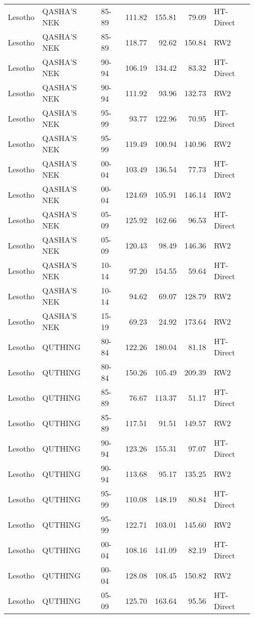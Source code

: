 \begin{longtable}{lllrrrl}
  Lesotho & QASHA'S NEK & 85-89 & 111.82 & 155.81 & 79.09 & HT-Direct \\ 
  Lesotho & QASHA'S NEK & 85-89 & 118.77 & 92.62 & 150.84 & RW2 \\ 
  Lesotho & QASHA'S NEK & 90-94 & 106.19 & 134.42 & 83.32 & HT-Direct \\ 
  Lesotho & QASHA'S NEK & 90-94 & 111.92 & 93.96 & 132.73 & RW2 \\ 
  Lesotho & QASHA'S NEK & 95-99 & 93.77 & 122.96 & 70.95 & HT-Direct \\ 
  Lesotho & QASHA'S NEK & 95-99 & 119.49 & 100.94 & 140.96 & RW2 \\ 
  Lesotho & QASHA'S NEK & 00-04 & 103.49 & 136.54 & 77.73 & HT-Direct \\ 
  Lesotho & QASHA'S NEK & 00-04 & 124.69 & 105.91 & 146.14 & RW2 \\ 
  Lesotho & QASHA'S NEK & 05-09 & 125.92 & 162.66 & 96.53 & HT-Direct \\ 
  Lesotho & QASHA'S NEK & 05-09 & 120.43 & 98.49 & 146.36 & RW2 \\ 
  Lesotho & QASHA'S NEK & 10-14 & 97.20 & 154.55 & 59.64 & HT-Direct \\ 
  Lesotho & QASHA'S NEK & 10-14 & 94.62 & 69.07 & 128.79 & RW2 \\ 
  Lesotho & QASHA'S NEK & 15-19 & 69.23 & 24.92 & 173.64 & RW2 \\ 
  Lesotho & QUTHING & 80-84 & 122.26 & 180.04 & 81.18 & HT-Direct \\ 
  Lesotho & QUTHING & 80-84 & 150.26 & 105.49 & 209.39 & RW2 \\ 
  Lesotho & QUTHING & 85-89 & 76.67 & 113.37 & 51.17 & HT-Direct \\ 
  Lesotho & QUTHING & 85-89 & 117.51 & 91.51 & 149.57 & RW2 \\ 
  Lesotho & QUTHING & 90-94 & 123.26 & 155.31 & 97.07 & HT-Direct \\ 
  Lesotho & QUTHING & 90-94 & 113.68 & 95.17 & 135.25 & RW2 \\ 
  Lesotho & QUTHING & 95-99 & 110.08 & 148.19 & 80.84 & HT-Direct \\ 
  Lesotho & QUTHING & 95-99 & 122.71 & 103.01 & 145.60 & RW2 \\ 
  Lesotho & QUTHING & 00-04 & 108.16 & 141.09 & 82.19 & HT-Direct \\ 
  Lesotho & QUTHING & 00-04 & 128.08 & 108.45 & 150.82 & RW2 \\ 
  Lesotho & QUTHING & 05-09 & 125.70 & 163.64 & 95.56 & HT-Direct \\ 

\end{longtable}
